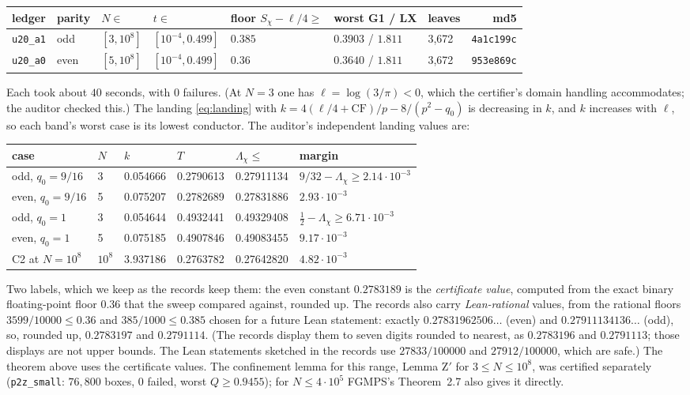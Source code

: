 \documentclass[11pt]{article}
\theoremstyle{definition}
\newcommand{\lean}[1]{\texttt{#1}}
\newcommand{\Lc}{\Lambda}
\begin{document}
\begin{center}\small
\begin{tabular}{@{}lllllllr@{}}
\toprule
ledger & parity & $N \in$ & $t \in$ & floor $S_\chi - \ell/4 \ge$ & worst G1 / LX & leaves & md5 \\
\midrule
\lean{u20\_a1} & odd & $[3, 10^8]$ & $[10^{-4}, 0.499]$ & $0.385$ & $0.3903$ / $1.811$ & 3,672 & \lean{4a1c199c} \\
\lean{u20\_a0} & even & $[5, 10^8]$ & $[10^{-4}, 0.499]$ & $0.36$ & $0.3640$ / $1.811$ & 3,672 & \lean{953e869c} \\
\bottomrule
\end{tabular}
\end{center}
Each took about $40$ seconds, with $0$ failures. (At $N = 3$ one has $\ell = \log(3/\pi) < 0$, which the certifier's domain handling accommodates; the auditor checked this.) The landing \eqref{eq:landing} with $k = 4(\ell/4 + \mathrm{CF})/p - 8/(p^2 - q_0)$ is decreasing in $k$, and $k$ increases with $\ell$, so each band's worst case is its lowest conductor. The auditor's independent landing values are:
\begin{center}\small
\begin{tabular}{@{}llllll@{}}
\toprule
case & $N$ & $k$ & $T$ & $\Lc_\chi \le$ & margin \\
\midrule
odd, $q_0 = 9/16$ & 3 & 0.054666 & 0.2790613 & 0.27911134 & $9/32 - \Lc_\chi \ge 2.14\cdot10^{-3}$ \\
even, $q_0 = 9/16$ & 5 & 0.075207 & 0.2782689 & 0.27831886 & $2.93\cdot10^{-3}$ \\
odd, $q_0 = 1$ & 3 & 0.054644 & 0.4932441 & 0.49329408 & $\tfrac12 - \Lc_\chi \ge 6.71\cdot10^{-3}$ \\
even, $q_0 = 1$ & 5 & 0.075185 & 0.4907846 & 0.49083455 & $9.17\cdot10^{-3}$ \\
C2 at $N = 10^8$ & $10^8$ & 3.937186 & 0.2763782 & 0.27642820 & $4.82\cdot10^{-3}$ \\
\bottomrule
\end{tabular}
\end{center}
Two labels, which we keep as the records keep them: the even constant $0.2783189$ is the \emph{certificate value}, computed from the exact binary floating-point floor $0.36$ that the sweep compared against, rounded up. The records also carry \emph{Lean-rational} values, from the rational floors $3599/10000 \le 0.36$ and $385/1000 \le 0.385$ chosen for a future Lean statement: exactly $0.27831962506\ldots$ (even) and $0.27911134136\ldots$ (odd), so, rounded up, $0.2783197$ and $0.2791114$. (The records display them to seven digits rounded to nearest, as $0.2783196$ and $0.2791113$; those displays are not upper bounds. The Lean statements sketched in the records use $27833/100000$ and $27912/100000$, which are safe.) The theorem above uses the certificate values. The confinement lemma for this range, Lemma Z$'$ for $3 \le N \le 10^8$, was certified separately (\lean{p2z\_small}: $76{,}800$ boxes, $0$ failed, worst $Q \ge 0.9455$); for $N \le 4\cdot10^5$ FGMPS's Theorem~2.7 also gives it directly.
\end{document}
